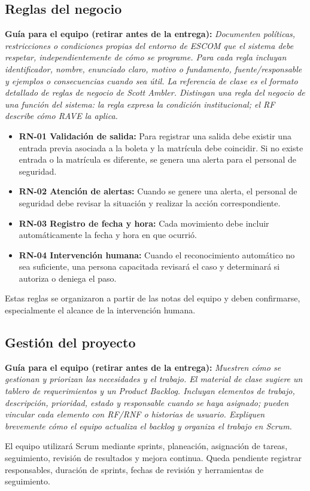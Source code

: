 \documentclass[12pt,letterpaper]{article}
\newcommand{\guia}[1]{\par\smallskip\noindent\textbf{Guía para el equipo (retirar antes de la entrega):} \textit{#1}\par\smallskip}
\begin{document}
\subsection{Reglas del negocio}
\guia{Documenten políticas, restricciones o condiciones propias del entorno de ESCOM que el sistema debe respetar, independientemente de cómo se programe. Para cada regla incluyan identificador, nombre, enunciado claro, motivo o fundamento, fuente/responsable y ejemplos o consecuencias cuando sea útil. La referencia de clase es el formato detallado de reglas de negocio de Scott Ambler. Distingan una regla del negocio de una función del sistema: la regla expresa la condición institucional; el RF describe cómo RAVE la aplica.}
\begin{itemize}
\item \textbf{RN-01 Validación de salida:} Para registrar una salida debe existir una entrada previa asociada a la boleta y la matrícula debe coincidir. Si no existe entrada o la matrícula es diferente, se genera una alerta para el personal de seguridad.
\item \textbf{RN-02 Atención de alertas:} Cuando se genere una alerta, el personal de seguridad debe revisar la situación y realizar la acción correspondiente.
\item \textbf{RN-03 Registro de fecha y hora:} Cada movimiento debe incluir automáticamente la fecha y hora en que ocurrió.
\item \textbf{RN-04 Intervención humana:} Cuando el reconocimiento automático no sea suficiente, una persona capacitada revisará el caso y determinará si autoriza o deniega el paso.
\end{itemize}
Estas reglas se organizaron a partir de las notas del equipo y deben confirmarse, especialmente el alcance de la intervención humana.
\subsection{Gestión del proyecto}
\guia{Muestren cómo se gestionan y priorizan las necesidades y el trabajo. El material de clase sugiere un tablero de requerimientos y un Product Backlog. Incluyan elementos de trabajo, descripción, prioridad, estado y responsable cuando se haya asignado; pueden vincular cada elemento con RF/RNF o historias de usuario. Expliquen brevemente cómo el equipo actualiza el backlog y organiza el trabajo en Scrum.}
El equipo utilizará Scrum mediante sprints, planeación, asignación de tareas, seguimiento, revisión de resultados y mejora continua. Queda pendiente registrar responsables, duración de sprints, fechas de revisión y herramientas de seguimiento.
\end{document}
